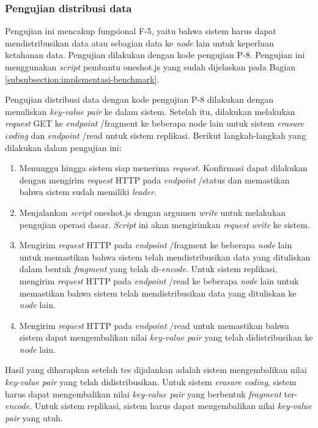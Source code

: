 \subsubsection{Pengujian distribusi data}
\label{subsubsection:pengujian-distribusi-data}

Pengujian ini mencakup fungsional F-5, yaitu bahwa sistem harus dapat mendistribusikan data atau sebagian data ke \textit{node} lain untuk keperluan ketahanan data. Pengujian dilakukan dengan kode pengujian P-8. Pengujian ini menggunakan \textit{script} pembantu oneshot.js yang sudah dijelaskan pada Bagian \ref{subsubsection:implementasi-benchmark}.

Pengujian distribusi data dengan kode pengujian P-8 dilakukan dengan menuliskan \textit{key-value pair} ke dalam sistem. Setelah itu, dilakukan melakukan \textit{request} GET ke \textit{endpoint} /fragment ke beberapa node lain untuk sistem \textit{erasure coding} dan \textit{endpoint} /read untuk sistem replikasi. Berikut langkah-langkah yang dilakukan dalam pengujian ini:

\begin{enumerate}
	\item Menunggu hingga sistem siap menerima \textit{request}. Konfirmasi dapat dilakukan dengan mengirim \textit{request} HTTP pada \textit{endpoint} /status dan memastikan bahwa sistem sudah memiliki \textit{leader}.
	\item Menjalankan \textit{script} oneshot.js dengan argumen \textit{write} untuk melakukan pengujian operasi dasar. \textit{Script} ini akan mengirimkan \textit{request} \textit{write} ke sistem.
	\item Mengirim \textit{request} HTTP pada \textit{endpoint} /fragment ke beberapa \textit{node} lain untuk memastikan bahwa sistem telah mendistribusikan data yang dituliskan dalam bentuk \textit{fragment} yang telah di-\textit{encode}. Untuk sistem replikasi, mengirim \textit{request} HTTP pada \textit{endpoint} /read ke beberapa \textit{node} lain untuk memastikan bahwa sistem telah mendistribusikan data yang dituliskan ke \textit{node} lain.
	\item Mengirim \textit{request} HTTP pada \textit{endpoint} /read untuk memastikan bahwa sistem dapat mengembalikan nilai \textit{key-value pair} yang telah didistribusikan ke \textit{node} lain.
\end{enumerate}

Hasil yang diharapkan setelah tes dijalankan adalah sistem mengembalikan nilai \textit{key-value pair} yang telah didistribusikan. Untuk sistem \textit{erasure coding}, sistem harus dapat mengembalikan nilai \textit{key-value pair} yang berbentuk \textit{fragment} ter-\textit{encode}. Untuk sistem replikasi, sistem harus dapat mengembalikan nilai \textit{key-value pair} yang utuh.